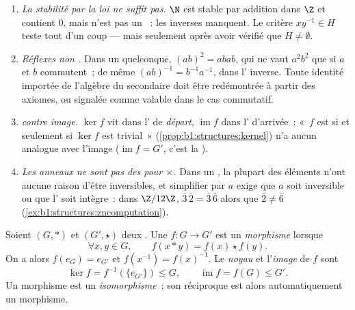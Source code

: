 \begin{remark}\label{rem:b1:structures:pitfalls}
\begin{enumerate}
  \item \emph{La stabilité par la loi ne suffit pas.} $\N$ est
        stable par addition dans $\Z$ et contient $0$, mais n'est
        pas un ~: les inverses manquent. Le critère
        $xy^{-1} \in H$ teste tout d'un coup --- mais seulement
        après avoir vérifié que $H \neq \emptyset$.
  \item \emph{Réflexes non .} Dans un  quelconque,
        $(ab)^2 = abab$, qui ne vaut $a^2b^2$ que si $a$ et $b$
        commutent~; de même $(ab)^{-1} = b^{-1}a^{-1}$, dans
        l' inverse. Toute identité importée de l'algèbre du
        secondaire doit être redémontrée à partir des axiomes, ou
        signalée comme valable dans le cas commutatif.
  \item \emph{ contre image.} $\ker f$ vit dans l' de
        \emph{départ}, $\operatorname{im} f$ dans l'
        d'arrivée~; «~$f$ est  si et seulement si $\ker f$
        est trivial~» (\cref{prop:b1:structures:kernel}) n'a aucun
        analogue avec l'image ($\operatorname{im} f = G'$, c'est la
        ).
  \item \emph{Les anneaux ne sont pas des  pour $\times$.}
        Dans un , la plupart des éléments n'ont aucune raison
        d'être inversibles, et simplifier par $a$ exige que $a$
        soit inversible ou que l' soit intègre~: dans
        $\Z/12\Z$, $\overline3\,\overline2 =
        \overline3\,\overline6$ alors que $\overline2 \neq
        \overline6$ (\cref{ex:b1:structures:zncomputation}).
\end{enumerate}
\end{remark}

\begin{definition}\label{def:b1:structures:morphism}
Soient $(G, *)$ et $(G', \star)$ deux . Une 
$f \colon G \to G'$ est un \emph{morphisme}
lorsque
\[
\forall x, y \in G, \qquad f(x * y) = f(x) \star f(y).
\]
On a alors $f(e_G) = e_{G'}$ et $f(x^{-1}) = f(x)^{-1}$. Le
\emph{noyau} et l'\emph{image} de $f$ sont
\[
\ker f = f^{-1}(\{e_{G'}\}) \leq G,
\qquad
\operatorname{im} f = f(G) \leq G' .
\]
Un morphisme  est un \emph{isomorphisme}~; son 
réciproque est alors automatiquement un morphisme.
\end{definition}

